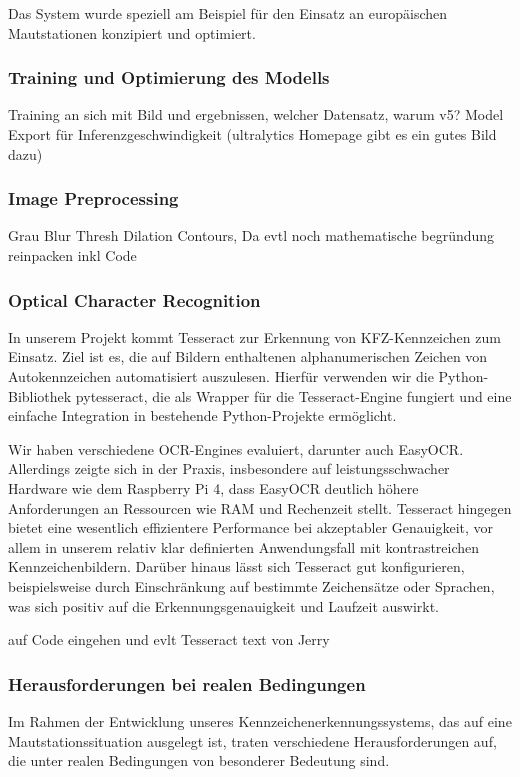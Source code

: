 Das System wurde speziell am Beispiel für den Einsatz an europäischen Mautstationen konzipiert und optimiert. 
\subsubsection{Training und Optimierung des Modells}
Training an sich mit Bild und ergebnissen, welcher Datensatz, warum v5? Model Export für Inferenzgeschwindigkeit (ultralytics Homepage gibt es ein gutes Bild dazu)
\subsubsection{Image Preprocessing}
Grau Blur Thresh Dilation Contours, Da evtl noch mathematische begründung reinpacken inkl Code
\subsubsection{Optical Character Recognition}
In unserem Projekt kommt Tesseract zur Erkennung von KFZ-Kennzeichen zum Einsatz. Ziel ist es, die auf Bildern enthaltenen alphanumerischen Zeichen von Autokennzeichen automatisiert auszulesen. Hierfür verwenden wir die Python-Bibliothek pytesseract, die als Wrapper für die Tesseract-Engine fungiert und eine einfache Integration in bestehende Python-Projekte ermöglicht. 

Wir haben verschiedene OCR-Engines evaluiert, darunter auch EasyOCR. Allerdings zeigte sich in der Praxis, insbesondere auf leistungsschwacher Hardware wie dem Raspberry Pi 4, dass EasyOCR deutlich höhere Anforderungen an Ressourcen wie RAM und Rechenzeit stellt. Tesseract hingegen bietet eine wesentlich effizientere Performance bei akzeptabler Genauigkeit, vor allem in unserem relativ klar definierten Anwendungsfall mit kontrastreichen Kennzeichenbildern. Darüber hinaus lässt sich Tesseract gut konfigurieren, beispielsweise durch Einschränkung auf bestimmte Zeichensätze oder Sprachen, was sich positiv auf die Erkennungsgenauigkeit und Laufzeit auswirkt. 

auf Code eingehen und evlt Tesseract text von Jerry
\subsubsection{Herausforderungen bei realen Bedingungen}
Im Rahmen der Entwicklung unseres Kennzeichenerkennungssystems, das auf eine Mautstationssituation ausgelegt ist, traten verschiedene Herausforderungen auf, die unter realen Bedingungen von besonderer Bedeutung sind. \singlespacing

